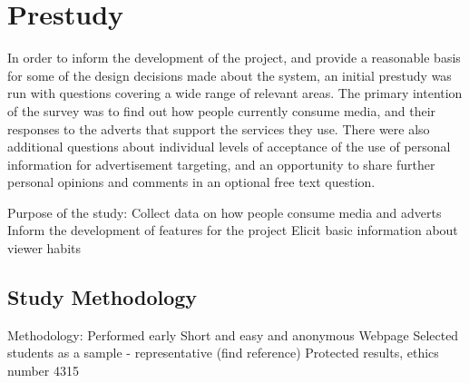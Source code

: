 \section{Prestudy}
\label{sec:prestudy}
In order to inform the development of the project, and provide a reasonable basis for some of the design decisions made about the system, an initial prestudy was run with questions covering a wide range of relevant areas. The primary intention of the survey was to find out how people currently consume %
media, and their responses to the adverts that support the services they use. There were also additional questions about individual levels of acceptance of the use of personal information for advertisement targeting, and an opportunity to share further personal opinions and comments in an optional free text question. 






Purpose of the study:
Collect data on how people consume media and adverts
Inform the development of features for the project
Elicit basic information about viewer habits

\subsection{Study Methodology}

Methodology:
Performed early
Short and easy and anonymous
Webpage
Selected students as a sample - representative (find reference)
Protected results, ethics number 4315



